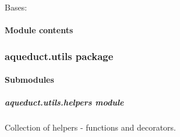 \documentclass[a4paper,10pt,english]{sphinxmanual}
\begin{document}
\begin{fulllineitems}
\label{aqueduct.traj.selections:aqueduct.traj.selections.CompactSelectionMDA}
Bases: \href{http://docs.python.org/2/library/functions.html\#object}{}

\begin{fulllineitems}
\label{aqueduct.traj.selections:aqueduct.traj.selections.CompactSelectionMDA.__init__}
\end{fulllineitems}


\begin{fulllineitems}
\label{aqueduct.traj.selections:aqueduct.traj.selections.CompactSelectionMDA.toSelectionMDA}
\end{fulllineitems}


\end{fulllineitems}



\paragraph{Module contents}
\label{aqueduct.traj:module-aqueduct.traj}\label{aqueduct.traj:module-contents}

\subsubsection{aqueduct.utils package}
\label{aqueduct.utils:aqueduct-utils-package}\label{aqueduct.utils::doc}

\paragraph{Submodules}
\label{aqueduct.utils:submodules}

\subparagraph{aqueduct.utils.helpers module}
\label{aqueduct.utils.helpers:module-aqueduct.utils.helpers}\label{aqueduct.utils.helpers:aqueduct-utils-helpers-module}\label{aqueduct.utils.helpers::doc}
Collection of helpers - functions and decorators.
\end{document}
